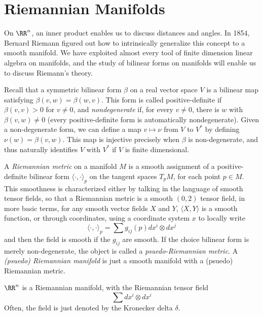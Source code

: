 \chapter{Riemannian Manifolds}

On $\RR^n$, an inner product enables us to discuss distances and angles. In 1854, Bernard Riemann figured out how to intrinsically generalize this concept to a smooth manifold. We have exploited almost every tool of finite dimension linear algebra on manifolds, and the study of bilinear forms on manifolds will enable us to discuss Riemann's theory.

Recall that a symmetric bilinear form $\beta$ on a real vector space $V$ is a bilinear map satisfying $\beta(v,w) = \beta(w,v)$. This form is called positive-definite if $\beta(v,v) > 0$ for $v \neq 0$, and {\it nondegenerate} if, for every $v \neq 0$, there is $w$ with $\beta(v,w) \neq 0$ (every positive-definite form is automatically nondegenerate). Given a non-degenerate form, we can define a map $v \mapsto \nu$ from $V$ to $V^*$ by defining $\nu(w) = \beta(v,w)$. This map is injective precisely when $\beta$ is non-degenerate, and thus naturally identifies $V$ with $V^*$ if $V$ is finite dimensional.

A \emph{Riemannian metric} on a manifold $M$ is a smooth assignment of a positive-definite bilinear form $\langle \cdot, \cdot \rangle_p$ on the tangent spaces $T_p M$, for each point $p \in M$. This smoothness is characterized either by talking in the language of smooth tensor fields, so that a Riemannian metric is a smooth $(0,2)$ tensor field, in more basic terms, for any smooth vector fields $X$ and $Y$, $\langle X, Y \rangle$ is a smooth function, or through coordinates, using a coordinate system $x$ to locally write
%
\[ \langle \cdot, \cdot \rangle_p = \sum g_{ij}(p) dx^i \otimes dx^j \]
%
and then the field is smooth if the $g_{ij}$ are smooth. If the choice bilinear form is merely non-degenerate, the object is called a \emph{psuedo-Riemannian metric}. A \emph{(psuedo) Riemannian manifold} is just a smooth manifold with a (psuedo) Riemannian metric.

\begin{example}
    $\RR^n$ is a Riemannian manifold, with the Riemannian tensor field
    \[ \sum dx^i \otimes dx^i \]
    Often, the field is just denoted by the Kronecker delta $\delta$.
\end{example}

